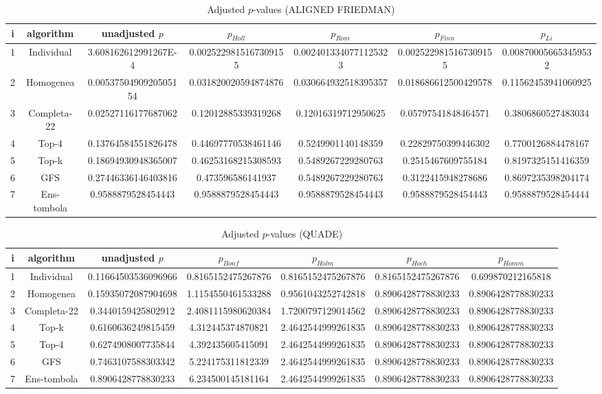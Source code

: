 \documentclass[a4paper,10pt]{article}
\begin{document}
\begin{landscape}
\begin{table}[!htp]
\centering\scriptsize
\caption{Adjusted $p$-values (ALIGNED FRIEDMAN)}
\begin{tabular}{ccccccc}
i&algorithm&unadjusted $p$&$p_{Holl}$&$p_{Rom}$&$p_{Finn}$&$p_{Li}$\\
\hline
1&Individual&3.608162612991267E-4&0.0025229815167309155&0.0024013340771125323&0.0025229815167309155&0.008700056653459532\\
2&Homogenea&0.0053750490920505154&0.031820020594874876&0.030664932518395357&0.018686612500429578&0.11562453941060925\\
3&Completa-22&0.02527116177687062&0.12012885339319268&0.12016319712950625&0.05797541848464571&0.3806860527483034\\
4&Top-4&0.13764584551826478&0.44697770538461146&0.5249901140148359&0.22829750399446302&0.7700126884478167\\
5&Top-k&0.18694930948365007&0.46253168215308593&0.5489267229280763&0.2515467609755184&0.8197325151416359\\
6&GFS&0.27446336146403816&0.473596586141937&0.5489267229280763&0.3122415948278686&0.8697235398204174\\
7&Ens-tombola&0.9588879528454443&0.9588879528454443&0.9588879528454443&0.9588879528454443&0.9588879528454444\\
\hline
\end{tabular}
\end{table}


\newpage

\begin{table}[!htp]
\centering\scriptsize
\caption{Adjusted $p$-values (QUADE)}
\begin{tabular}{ccccccc}
i&algorithm&unadjusted $p$&$p_{Bonf}$&$p_{Holm}$&$p_{Hoch}$&$p_{Homm}$\\
\hline
1&Individual&0.11664503536096966&0.8165152475267876&0.8165152475267876&0.8165152475267876&0.699870212165818\\
2&Homogenea&0.15935072087904698&1.1154550461533288&0.9561043252742818&0.8906428778830233&0.8906428778830233\\
3&Completa-22&0.3440159425802912&2.4081115980620384&1.7200797129014562&0.8906428778830233&0.8906428778830233\\
4&Top-k&0.6160636249815459&4.312445374870821&2.4642544999261835&0.8906428778830233&0.8906428778830233\\
5&Top-4&0.6274908007735844&4.392435605415091&2.4642544999261835&0.8906428778830233&0.8906428778830233\\
6&GFS&0.7463107588303342&5.224175311812339&2.4642544999261835&0.8906428778830233&0.8906428778830233\\
7&Ens-tombola&0.8906428778830233&6.234500145181164&2.4642544999261835&0.8906428778830233&0.8906428778830233\\
\hline
\end{tabular}
\end{table}


\end{landscape}
\end{document}
